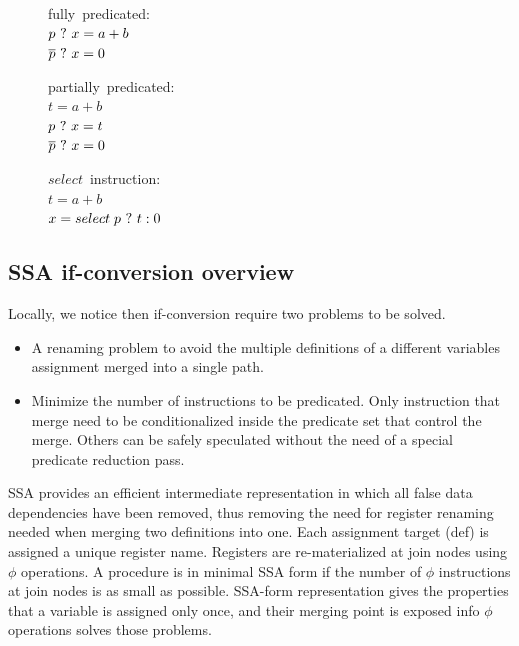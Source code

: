 \begin{figure}
\begin{minipage}[t]{4cm}
\mbox{fully predicated:} \\
$ p ~?~ x = a + b $ \\
$ \overline{p} ~?~ x = 0 $ \\
\end{minipage}
\begin{minipage}[t]{4cm}
\mbox{partially predicated:} \\
$t = a + b $ \\
$p ~?~ x = t $ \\
$\overline{p} ~?~ x = 0 $ \\
\end{minipage}
\begin{minipage}[t]{4cm}
\mbox{$select$ instruction:} \\
$t = a + b $ \\
$x = select \; p ~?~ t : 0 $ \\
\end{minipage}
\end{figure}

\subsection{SSA if-conversion overview}

Locally, we notice then if-conversion require two problems to be solved.
\begin{itemize}
\item A renaming problem to avoid the multiple definitions of a different variables assignment merged into a single path. 
\item Minimize the number of instructions to be predicated. Only instruction that merge need to be conditionalized inside the predicate set that control the merge. Others can be safely speculated without the need of a special predicate reduction pass. 
\end {itemize}

SSA \cite{BriggsSSA} provides an efficient intermediate representation in which all false data dependencies have been removed, thus removing the need for register renaming needed when merging two definitions into one. Each assignment target (def) is assigned a unique register name. Registers are re-materialized at join nodes using $\phi$ operations. A procedure is in minimal SSA form if the number of $\phi$ instructions at join nodes is as small as possible. SSA-form representation gives the properties that a variable is assigned only once, and their merging point is exposed info $\phi$ operations solves those problems. 

